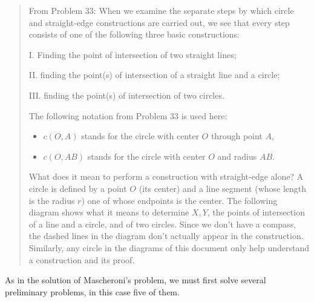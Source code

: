 \begin{quote}
From Problem 33: When we examine the separate steps by which circle and straight-edge constructions are carried out, we see that every step consists of one of the following three basic constructions:

I. Finding the point of intersection of two straight lines;

II. finding the point(s) of intersection of a straight line and a circle;

III. finding the point(s) of intersection of two circles.

The following notation from Problem 33 is used here:
\begin{itemize}
\item $c(O,A)$ stands for the circle with center $O$ through point $A$,
\item $c(O,AB)$ stands for the circle with center $O$ and radius $AB$.
\end{itemize}
What does it mean to perform a construction with straight-edge alone? A circle is defined by a point $O$ (its center) and a line segment (whose length is the radius $r$) one of whose endpoints is the center. The following diagram shows what it means to determine $X,Y$, the points of intersection of a line and a circle, and of two circles. Since we don't have a compass, the dashed lines in the diagram don't actually appear in the construction. Similarly, any circle in the diagrams of this document only help understand a construction and its proof.
\begin{center}
\end{center}
\end{quote}
As in the solution of Mascheroni's problem, we must first solve several preliminary problems, in this case five of them. 

